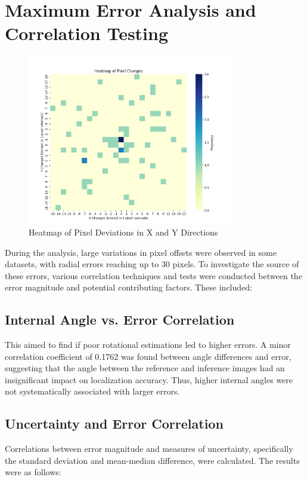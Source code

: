 \section{Maximum Error Analysis and Correlation Testing}



\begin{figure}[H]
    \centering
    \includegraphics[width=0.8\textwidth]{Chapter 5/RESULTPLOTS/BIASPLOT_XY_HEAT.png}
    \caption{Heatmap of Pixel Deviations in X and Y Directions}
    \label{fig:Heatmap_XY_Dev}
\end{figure}


During the analysis, large variations in pixel offsets were observed in some datasets, with radial errors reaching up to 30 pixels. To investigate the source of these errors, various correlation techniques and tests were conducted between the error magnitude and potential contributing factors. These included:

\subsection{Internal Angle vs. Error Correlation}
This aimed to find if poor rotational estimations led to higher errors. A minor correlation coefficient of 0.1762 was found between angle differences and error, suggesting that the angle between the reference and inference images had an insignificant impact on localization accuracy. Thus, higher internal angles were not systematically associated with larger errors.

\subsection{Uncertainty and Error Correlation}
Correlations between error magnitude and measures of uncertainty, specifically the standard deviation and mean-median difference, were calculated. The results were as follows:

